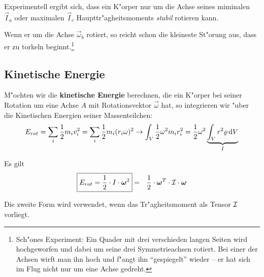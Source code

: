 \begin{Wichtig}
   Experimentell ergibt sich, dass ein K"orper nur um die Achse seines
   miminalen $\vec I_a$ oder maximalen $\vec I_c$
   Haupttr"agheitsmoments \emph{stabil} rotieren kann.
\end{Wichtig}
Wenn er um die Achse $\vec \omega_b$ rotiert, so reicht schon die
kleineste St"orung aus, dass er zu torkeln beginnt.\footnote{Sch"ones
  Experiment: Ein Quader mit drei verschieden langen Seiten wird
  hochgeworfen und dabei um seine drei Symmetrieachsen rotiert. Bei
  einer der Achsen wirft man ihn hoch und f"angt ihn "`gespiegelt"'
  wieder -- er hat sich im Flug nicht nur um eine Achse gedreht.}








\subsection{Kinetische Energie}
\label{kap_kinetische-energie}



M"ochten wir die \textbf{kinetische Energie} berechnen, die ein K"orper
bei seiner Rotation um eine Achse $A$ mit Rotationsvektor $\vec
\omega$ hat, so integrieren wir "uber die Kinetischen Energien seiner
Massenteilchen:
\begin{equation}
   \label{eq:41}
   E_{rot} = \sum_i \frac{1}{2}m_i v_i^2 = 
\sum_i \frac{1}{2} m_i (r_i \omega)^2 \to 
\int_V \frac{1}{2}\omega^2 m_ir_i^2 =
\frac{1}{2} \omega^2 \underbrace{\int_V r^2 \varrho \, \mathrm{d} V}_I
\end{equation}

\begin{Wichtig}
Es gilt
\begin{equation}
   \label{eq:42}
   \boxed{
E_{rot} = \frac{1}{2} \cdot I \cdot \boldsymbol{\omega}^2
} = ~ ~  \frac{1}{2} \cdot \boldsymbol{\omega}^T \cdot {\mathcal{I}} \cdot \boldsymbol{\omega}
\end{equation}
\end{Wichtig}
Die zweite Form wird verwendet, wenn das Tr"agheitsmoment als Tensor
${\mathcal{I}}$ vorliegt.

